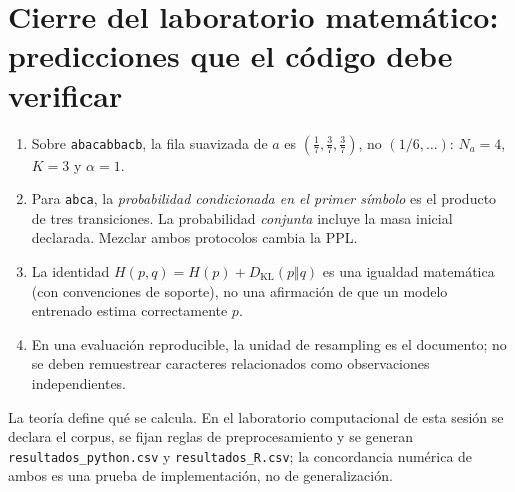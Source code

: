 
\label{lab:mat}


\chapter*{Cierre del laboratorio matemático: predicciones que el código debe verificar}
\label{lab:mat:cierre}
\begin{enumerate}
\item Sobre \texttt{abacabbacb}, la fila suavizada de $a$ es
$\left(\frac17,\frac37,\frac37\right)$, no $(1/6,\ldots)$:
$N_a=4$, $K=3$ y $\alpha=1$.
\item Para \texttt{abca}, la \emph{probabilidad condicionada en el primer
símbolo} es el producto de tres transiciones. La probabilidad \emph{conjunta}
incluye la masa inicial declarada. Mezclar ambos protocolos cambia la PPL.
\item La identidad $H(p,q)=H(p)+D_{\mathrm{KL}}(p\Vert q)$ es una igualdad
matemática (con convenciones de soporte), no una afirmación de que un modelo
entrenado estima correctamente $p$.
\item En una evaluación reproducible, la unidad de resampling es el documento;
no se deben remuestrear caracteres relacionados como observaciones independientes.
\end{enumerate}
\begin{puente}
La teoría define qué se calcula. En el laboratorio computacional de esta sesión
se declara el corpus, se fijan reglas de preprocesamiento y se generan
\texttt{resultados\_python.csv} y \texttt{resultados\_R.csv}; la concordancia
numérica de ambos es una prueba de implementación, no de generalización.
\end{puente}
